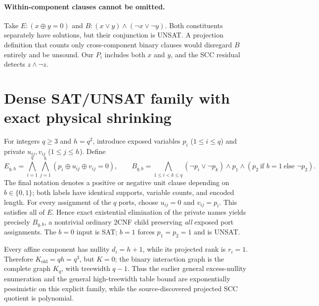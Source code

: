\documentclass[11pt]{article}
\begin{document}
\paragraph{Within-component clauses cannot be omitted.} Take $E:(x\oplus y=0)$ and $B:(x\vee y)\land(\neg x\vee\neg y)$. Both constituents separately have solutions, but their conjunction is UNSAT. A projection definition that counts only cross-component binary clauses would disregard $B$ entirely and be unsound. Our $P_i$ includes both $x$ and $y$, and the SCC residual detects $z\land\neg z$.

\section{Dense SAT/UNSAT family with exact physical shrinking}
For integers $q\ge3$ and $h=q^2$, introduce exposed variables $p_i$ ($1\le i\le q$) and private $u_{ij},v_{ij}$ ($1\le j\le h$). Define
\[
 E_{q,h}=\bigwedge_{i=1}^{q}\bigwedge_{j=1}^{h}
 (p_i\oplus u_{ij}\oplus v_{ij}=0),
 \qquad
 B_{q,b}=\bigwedge_{1\le i<k\le q}(\neg p_i\vee\neg p_k)
 \land p_1\land (p_2\ \text{if }b=1\ \text{else }\neg p_2).
\]
The final notation denotes a positive or negative unit clause depending on $b\in\{0,1\}$; both labels have identical supports, variable counts, and encoded length. For every assignment of the $q$ ports, choose $u_{ij}=0$ and $v_{ij}=p_i$. This satisfies all of $E$. Hence exact existential elimination of the private names yields precisely $B_{q,b}$, a nontrivial ordinary 2CNF child preserving \emph{all} exposed port assignments. The $b=0$ input is SAT; $b=1$ forces $p_1=p_2=1$ and is UNSAT.

Every affine component has nullity $d_i=h+1$, while its projected rank is $r_i=1$. Therefore $K_{\mathrm{old}}=q h=q^3$, but $K=0$; the binary interaction graph is the complete graph $K_q$, with treewidth $q-1$. Thus the earlier general excess-nullity enumeration and the general high-treewidth table bound are exponentially pessimistic on this explicit family, while the source-discovered projected SCC quotient is polynomial.
\end{document}

